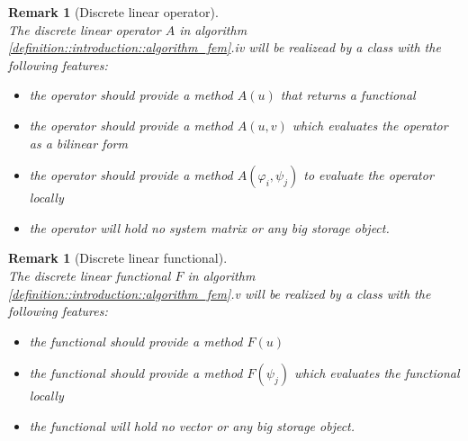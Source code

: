 \documentclass[a4paper,11pt]{article}
\numberwithin{equation}{section}
\newtheorem{remark}[definition]{Remark}
\newcommand{\theoremNewline}{\hspace{1mm}\\}
\newcommand{\theoremEndLine}{\hspace{1mm}}
\begin{document}
    \begin{remark}[Discrete linear operator]\theoremNewline
      \label{remark::introduction::discrete_linear_operator}
      The discrete linear operator $A$ in algorithm \ref{definition::introduction::algorithm_fem}.iv will be realizead
      by a class with the following features:\\
      \begin{itemize}
        \item the operator should provide a method $A(u)$ that returns a functional
        \item the operator should provide a method $A(u,v)$ which evaluates the operator as a bilinear form
        \item the operator should provide a method $A(\varphi_i,\psi_j)$ to evaluate the operator locally
        \item the operator will hold no system matrix or any big storage object.
      \end{itemize}
    \end{remark}\theoremEndLine

    \begin{remark}[Discrete linear functional]\theoremNewline
      \label{remark::introduction::discrete_linear_functional}
      The discrete linear functional $F$ in algorithm \ref{definition::introduction::algorithm_fem}.v will be realized
      by a class with the following features:\\
      \begin{itemize}
        \item the functional should provide a method $F(u)$
        \item the functional should provide a method $F(\psi_j)$ which evaluates the functional locally
        \item the functional will hold no vector or any big storage object.
      \end{itemize}
    \end{remark}\theoremEndLine
\end{document}
